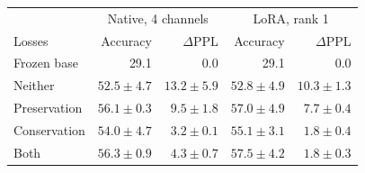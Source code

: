 \begin{tabular}{@{}lrrrr@{}}
\toprule
 & \multicolumn{2}{c}{Native, 4 channels} & \multicolumn{2}{c}{LoRA, rank 1}\\
Losses & Accuracy & $\Delta$PPL & Accuracy & $\Delta$PPL\\
\midrule
Frozen base & 29.1 & 0.0 & 29.1 & 0.0\\
Neither & $52.5 \pm 4.7$ & $13.2 \pm 5.9$ & $52.8 \pm 4.9$ & $10.3 \pm 1.3$\\
Preservation & $56.1 \pm 0.3$ & $9.5 \pm 1.8$ & $57.0 \pm 4.9$ & $7.7 \pm 0.4$\\
Conservation & $54.0 \pm 4.7$ & $3.2 \pm 0.1$ & $55.1 \pm 3.1$ & $1.8 \pm 0.4$\\
Both & $56.3 \pm 0.9$ & $4.3 \pm 0.7$ & $57.5 \pm 4.2$ & $1.8 \pm 0.3$\\
\bottomrule
\end{tabular}
